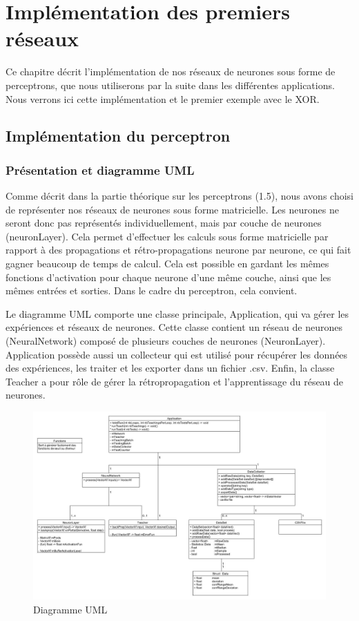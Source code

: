 \chapter{Implémentation des premiers réseaux}

Ce chapitre décrit l'implémentation de nos réseaux de neurones sous forme de perceptrons, que nous utiliserons par la suite dans les différentes applications. Nous verrons ici cette implémentation et le premier exemple avec le XOR.

\section{Implémentation du perceptron}

\subsection{Présentation et diagramme UML}

Comme décrit dans la partie théorique sur les perceptrons (1.5), nous avons choisi de représenter nos réseaux de neurones sous forme matricielle. Les neurones ne seront donc pas représentés individuellement, mais par couche de neurones (neuronLayer). Cela permet d'effectuer les calculs sous forme matricielle par rapport à des propagations et rétro-propagations neurone par neurone, ce qui fait gagner beaucoup de temps de calcul.
Cela est possible en gardant les mêmes fonctions d'activation pour chaque neurone d'une même couche, ainsi que les mêmes entrées et sorties. Dans le cadre du perceptron, cela convient.

Le diagramme UML comporte une classe principale, Application, qui va gérer les expériences et réseaux de neurones. Cette classe contient un réseau de neurones (NeuralNetwork) composé de plusieurs couches de neurones (NeuronLayer). Application possède aussi un collecteur qui est utilisé pour récupérer les données des expériences, les traiter et les exporter dans un fichier .csv. Enfin, la classe Teacher a pour rôle de gérer la rétropropagation et l'apprentissage du réseau de neurones.

\newpage

\begin{figure}[h]
\begin{center}
\includegraphics[width=1\textwidth]{images/umlDiagram.jpg}\caption{Diagramme UML}
\end{center}
\end{figure} 

